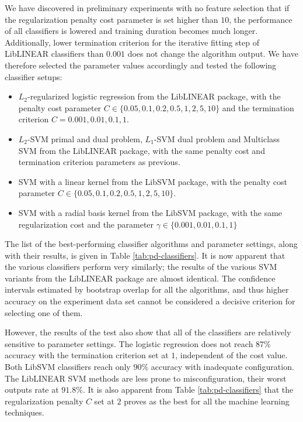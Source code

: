 \documentclass[12pt,notitlepage]{report}
\begin{document}
We have discovered in preliminary experiments with no feature selection that if the regularization penalty cost parameter is set higher than $10$, the performance of all classifiers is lowered and training duration becomes much longer. Additionally, lower termination criterion for the iterative fitting step of LibLINEAR classifiers than $0.001$ does not change the algorithm output. We have therefore selected the parameter values accordingly and tested the following classifier setups:
\begin{itemize}
    \item $L_2$-regularized logistic regression from the LibLINEAR package, with the penalty cost parameter $C\in\{0.05,0.1,0.2,0.5,1,2,5,10\}$ and the termination criterion $C=0.001, 0.01, 0.1, 1$.
    \item $L_2$-SVM primal and dual problem, $L_1$-SVM dual problem and Multiclass SVM from the LibLINEAR package, with the same penalty cost and termination criterion parameters as previous.
    \item SVM with a linear kernel from the LibSVM package, with the penalty cost parameter $C\in\{0.05,0.1,0.2,0.5,1,2,5,10\}$.
    \item SVM with a radial basis kernel from the LibSVM package, with the same regularization cost and the parameter $\gamma\in\{0.001,0.01,0.1,1\}$ 
\end{itemize}
The list of the best-performing classifier algorithms and parameter settings, along with their results, is given in Table \ref{tab:pd-classifiers}. It is now apparent that the various classifiers perform very similarly; the results of the various SVM variants from the LibLINEAR package are almost identical. The confidence intervals estimated by bootstrap overlap for all the algorithms, and thus higher accuracy on the experiment data set cannot be considered a decisive criterion for selecting one of them. 

However, the results of the test also show that all of the classifiers are relatively sensitive to parameter settings. The logistic regression does not reach $87\%$ accuracy with the termination criterion set at $1$, independent of the cost value. Both LibSVM classifiers reach only $90\%$ accuracy with inadequate configuration. The LibLINEAR SVM methods are less prone to misconfiguration, their worst outputs rate at $91.8\%$. It is also apparent from Table \ref{tab:pd-classifiers} that the regularization penalty $C$ set at $2$ proves as the best for all the machine learning techniques.
\end{document}
